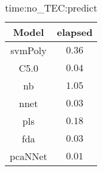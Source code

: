 \begin{table}[!ht]
	\centering
	\begin{tabular}{|c|c|}
		\hline
		Model & elapsed \\ \hline
		svmPoly & $0.36$ \\ \hline
		C5.0 & $0.04$ \\ \hline
		nb & $1.05$ \\ \hline
		nnet & $0.03$ \\ \hline
		pls & $0.18$ \\ \hline
		fda & $0.03$ \\ \hline
		pcaNNet & $0.01$ \\ \hline
	\end{tabular}
	\caption{time:no_TEC:predict}
	\label{tab:time:no_TEC:predict}
\end{table}
